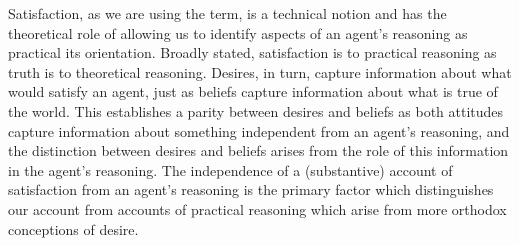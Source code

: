 \documentclass[10pt]{article}
\begin{document}
Satisfaction, as we are using the term, is a technical notion and has the theoretical role of allowing us to identify aspects of an agent's reasoning as practical its orientation.
Broadly stated, satisfaction is to practical reasoning as truth is to theoretical reasoning.
Desires, in turn, capture information about what would satisfy an agent, just as beliefs capture information about what is true of the world.
This establishes a parity between desires and beliefs as both attitudes capture information about something independent from an agent's reasoning, and the distinction between desires and beliefs arises from the role of this information in the agent's reasoning.
The independence of a (substantive) account of satisfaction from an agent's reasoning is the primary factor which distinguishes our account from accounts of practical reasoning which arise from more orthodox conceptions of desire.
\end{document}
